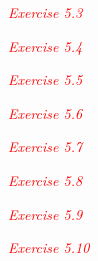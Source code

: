 \textcolor{red}{\textit{Exercise 5.3}}
\begin{adjustwidth}{1cm}{}
\end{adjustwidth}

\textcolor{red}{\textit{Exercise 5.4}}
\begin{adjustwidth}{1cm}{}
\end{adjustwidth}

\textcolor{red}{\textit{Exercise 5.5}}
\begin{adjustwidth}{1cm}{}
\end{adjustwidth}

\textcolor{red}{\textit{Exercise 5.6}}
\begin{adjustwidth}{1cm}{}
\end{adjustwidth}

\textcolor{red}{\textit{Exercise 5.7}}
\begin{adjustwidth}{1cm}{}
\end{adjustwidth}

\textcolor{red}{\textit{Exercise 5.8}}
\begin{adjustwidth}{1cm}{}
\end{adjustwidth}

\textcolor{red}{\textit{Exercise 5.9}}
\begin{adjustwidth}{1cm}{}
\end{adjustwidth}

\textcolor{red}{\textit{Exercise 5.10}}
\begin{adjustwidth}{1cm}{}
\end{adjustwidth}
